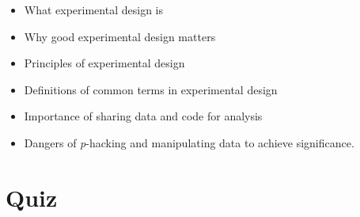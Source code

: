 \documentclass[10pt,a4paper,twoside]{article}\usepackage[]{graphicx}\usepackage[]{xcolor}
\begin{document}
\begin{itemize}
  \item What experimental design is
  \item Why good experimental design matters
  \item Principles of experimental design
  \item Definitions of common terms in experimental design
  \item Importance of sharing data and code for analysis
  \item Dangers of \emph{p}-hacking and manipulating data to achieve significance.
\end{itemize}

\section{Quiz}
\end{document}
